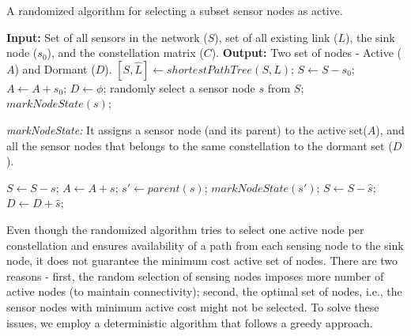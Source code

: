 \documentclass[conference]{IEEEtran}
\begin{document}
\begin{algorithm}
\caption{A randomized algorithm for selecting a subset sensor nodes as active.}
\label{algo:rand1}
\begin{algorithmic}[1]
\Statex \textbf{Input:} Set of all sensors in the network ($S$), set of all existing link ($L$), the sink node ($s_{0}$), and the constellation matrix ($C$).
\Statex \textbf{Output:} Two set of nodes - Active ($A$) and Dormant ($D$).
\State $[S,\hat{L}] \leftarrow shortestPathTree(S,L)$;
\State $S \leftarrow S - s_{0}$;
\State $A \leftarrow A + s_{0}$;
\State $D \leftarrow {\phi}$;
	\State randomly select a sensor node $s$ from $S$;
	\State $markNodeState(s)$;
\EndWhile
\end{algorithmic}
\end{algorithm}


\begin{algorithm}
\caption{\emph{markNodeState:} It assigns a sensor node (and its parent) to the active set($A$), and all the sensor nodes that belongs to the same constellation to the dormant set ($D$).}
\label{algo:marknode}
\begin{algorithmic}[1]
\State $S \leftarrow S - s$;
\State $A \leftarrow A + s$;
\State $s' \leftarrow parent(s)$;
	\State $markNodeState(s')$;
\EndIf
{}
		\State $S \leftarrow S - \hat{s}$;
		\State $D \leftarrow D + \hat{s}$;
	\EndIf 
\EndFor
\end{algorithmic}
\end{algorithm}


Even though the randomized algorithm tries to select one active node per constellation and ensures availability of a path from each sensing node to the sink node, it does not guarantee the minimum cost active set of nodes. There are two reasons - first, the random selection of sensing nodes imposes more number of active nodes (to maintain connectivity); second, the optimal set of nodes, i.e., the sensor nodes with minimum active cost might not be selected. To solve these issues, we employ a deterministic algorithm that follows a greedy approach. 
\end{document}
